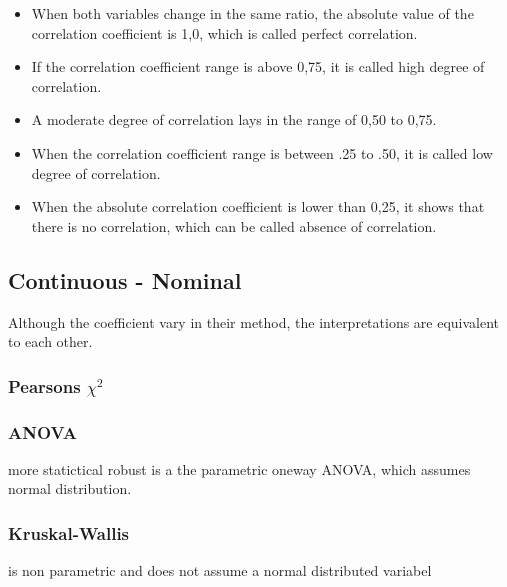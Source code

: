 \documentclass[a4paper,12pt]{report}
\begin{document}
\begin{itemize}
  \item When both variables change in the same ratio, the absolute value of the correlation coefficient is 1,0, which is called perfect correlation.
  \item If the correlation coefficient range is above 0,75, it is called high degree of correlation.
  \item A moderate degree of correlation lays in the range of 0,50 to 0,75.
  \item When the correlation coefficient range is between .25 to .50, it is called low degree of correlation.
  \item When the absolute correlation coefficient is lower than 0,25, it shows that there is no correlation, which can be called absence of correlation.
\end{itemize}	


\subsection{Continuous - Nominal}

 Although the coefficient vary in their method, the interpretations are equivalent to each other.

\subsubsection{Pearsons $\chi^2$}

%

\subsubsection{ANOVA}
more statictical robust
is a the parametric oneway ANOVA, which assumes normal distribution.

\subsubsection{Kruskal-Wallis}

is non parametric and does not assume a normal distributed variabel

\end{document}
